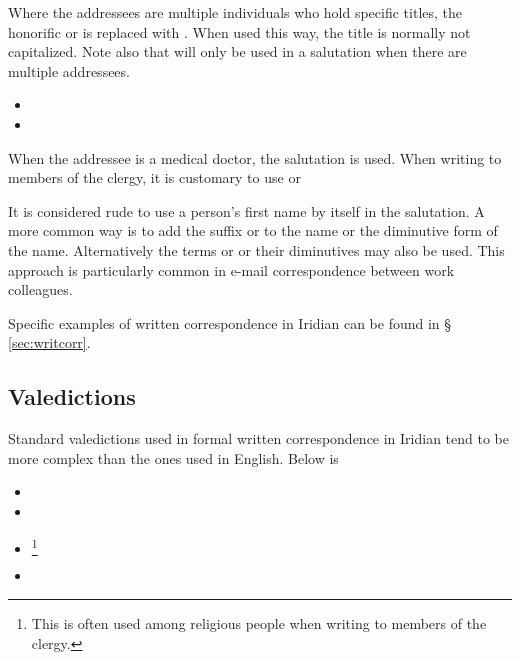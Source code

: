 Where the addressees are multiple individuals who hold specific titles, the honorific  or  is replaced with . When used this way, the title is normally not capitalized. Note also that  will only be used in a salutation when there are multiple addressees.

\begin{itemize}[nosep]
	\item {}
	\item {}
\end{itemize}

When the addressee is a medical doctor, the salutation  is used. When writing to members of the clergy, it is customary to use  or 

It is considered rude to use a person's first name by itself in the salutation. A more common way is to add the suffix  or  to the name or the diminutive form of the name. Alternatively the terms  or  or their diminutives may also be used. This approach is particularly common in e-mail correspondence between work colleagues.

Specific examples of written correspondence in Iridian can be found in \S\,\ref{sec:writcorr}.

\subsection{Valedictions}

Standard valedictions used in formal written correspondence in Iridian tend to be more complex than the ones used in English. Below is 

\begin{itemize}[nosep]
	\item {}
	\item {}
	\item {}\footnote{This is often used among religious people when writing to members of the clergy.}
	\item {}

\end{itemize}

